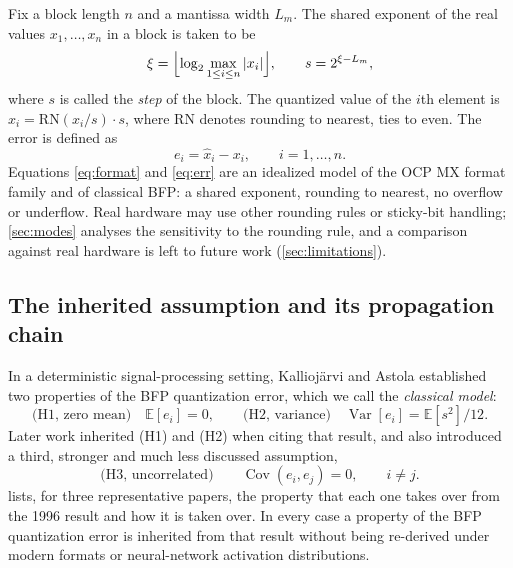 \documentclass[review,hidelinks,oneeqnum,onetabnum,onefignum,onethmnum]{siamart251216}
\begin{document}
Fix a block length $n$ and a mantissa width $L_m$. The shared exponent of the
real values $x_1,\dots,x_n$ in a block is taken to be
\begin{equation}
\xi=\Bigl\lfloor \log_2 \max_{1\le i\le n}|x_i|\Bigr\rfloor ,
\qquad
s=2^{\xi-L_m},
\label{eq:format}
\end{equation}
where $s$ is called the \emph{step} of the block. The quantized value of the
$i$th element is $\hat x_i=\mathrm{RN}(x_i/s)\cdot s$, where $\mathrm{RN}$
denotes rounding to nearest, ties to even. The error is defined as
\begin{equation}
e_i=\hat x_i-x_i,\qquad i=1,\dots,n .
\label{eq:err}
\end{equation}
Equations \cref{eq:format} and \cref{eq:err} are an idealized model of the OCP
MX format family and of classical BFP: a shared exponent, rounding to nearest,
no overflow or underflow. Real hardware may use other rounding rules or
sticky-bit handling; \cref{sec:modes} analyses the sensitivity to the rounding
rule, and a comparison against real hardware is left to future work
(\cref{sec:limitations}).

\subsection{The inherited assumption and its propagation chain}

In a deterministic signal-processing setting, Kallioj\"arvi and Astola
\cite{kalliojarvi1996} established two properties of the BFP quantization error,
which we call the \emph{classical model}:
\begin{equation}
\text{(H1, zero mean)}\quad \mathbb{E}[e_i]=0,\qquad
\text{(H2, variance)}\quad \operatorname{Var}[e_i]=\mathbb{E}[s^2]/12 .
\label{eq:H1H2}
\end{equation}
Later work inherited (H1) and (H2) when citing that result, and also introduced a
third, stronger and much less discussed assumption,
\begin{equation}
\text{(H3, uncorrelated)}\qquad \operatorname{Cov}(e_i,e_j)=0,\qquad i\ne j .
\label{eq:H3}
\end{equation}
 lists, for three representative papers, the property that each
one takes over from the 1996 result and how it is taken over. In every case a
property of the BFP quantization error is inherited from that result without
being re-derived under modern formats or neural-network activation
distributions.
\end{document}
